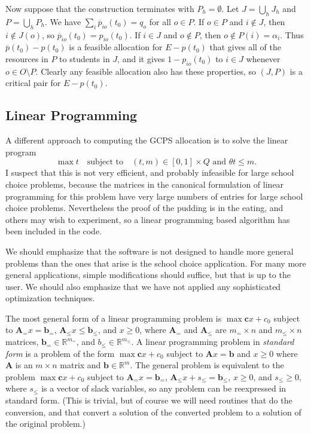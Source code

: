 \documentclass[12pt]{article}
\theoremstyle{definition}
\renewcommand{\Re}{\mathbb{R}}
\newcommand{\barp}{\overline{p}}
\newcommand{\bb}{\mathbf{b}}
\newcommand{\bc}{\mathbf{c}}
\newcommand{\bA}{\mathbf{A}}
\begin{document}
\begin{appendix}
Now suppose that the construction terminates with $P_h = \emptyset$.
Let $J = \bigcup_h J_h$ and $P = \bigcup_h P_h$.  We have $\sum_i
\barp_{io}(t_0) = q_o$ for all $o \in P$.  If $o \in P$ and $i \notin
J$, then $i \notin J(o)$, so $\barp_{io}(t_0) = p_{io}(t_0)$.  If $i
\in J$ and $o \notin P$, then $o \notin P(i) = \alpha_i$.  
Thus $\barp(t_0) - p(t_0)$ is a feasible
allocation for $E - p(t_0)$ that gives all of the resources in $P$ to
students in $J$, and it gives $1 - p_{io}(t_0)$ to $i \in J$ whenever
$o \in O \setminus P$. Clearly any feasible allocation also has these
properties, so $(J,P)$ is a critical pair for $E - p(t_0)$.

\subsection{Linear Programming}

A different approach to computing the GCPS allocation is to solve the
linear program
$$\max t \quad \text{subject to} \quad \text{$(t,m) \in [0,1] \times
  Q$ and $\theta t \le m$}.$$ I suspect that this is not very
efficient, and probably infeasible for large school choice problems,
because the matrices in the canonical formulation of linear
programming for this problem have very large numbers of entries for
large school choice problems.  Nevertheless the proof of the pudding
is in the eating, and others may wish to experiment, so a linear
programming based algorithm has been included in the code.

We should emphasize that the software is not designed to handle more
general problems than the ones that arise is the school choice
application.  For many more general applications, simple modifications
should suffice, but that is up to the user.  We should also emphasize
that we have not applied any sophisticated optimization techniques.

The most general form of a linear programming problem is $\max \bc x +
c_0$ subject to $\bA_= x = \bb_=$, $\bA_\le x \le \bb_\le$, and $x \ge
0$, where $\bA_=$ and $\bA_\le$ are $m_= \times n$ and $m_\le \times
n$ matrices, $\bb_= \in \Re^{m_=}$, and $b_\le \in \Re^{m_\le}$.  A
linear programming problem in \emph{standard form} is a problem of the
form $\max \bc x + c_0$ subject to $\bA x = \bb$ and $x \ge 0$ where
$\bA$ is an $m \times n$ matrix and $\bb \in \Re^m$.  The general
problem is equivalent to the problem $\max \bc x + c_0$ subject to
$\bA_= x = \bb_=$, $\bA_\le x + s_\le = \bb_\le$, $x \ge 0$, and
$s_\le \ge 0$, where $s_\le$ is a vector of slack variables, so any
problem can be reexpressed in standard form.  (This is trivial, but of
course we will need routines that do the conversion, and that convert
a solution of the converted problem to a solution of the original
problem.)


\end{appendix}
\end{document}
